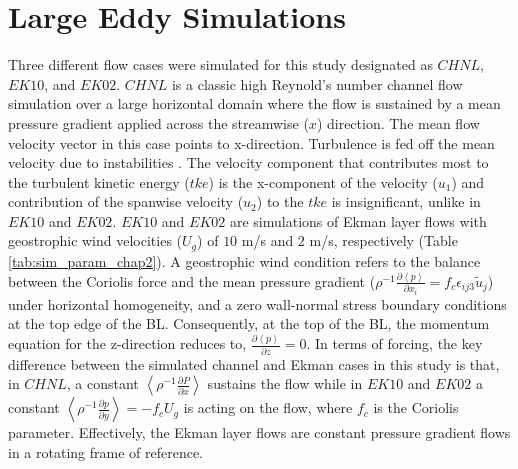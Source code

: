 \section{Large Eddy Simulations}
\label{sec:LES_chap2}
Three different flow cases were simulated for this study designated as $CHNL$, $EK10$, and $EK02$. $CHNL$ is a classic high Reynold's number channel flow simulation over a large horizontal domain where the flow is sustained by a mean pressure gradient applied across the streamwise ($x$) direction. The mean flow velocity vector in this case points to x-direction. Turbulence is fed off the mean velocity due to instabilities \citep{landahl_christensen_book_92}. The velocity component that contributes most to the turbulent kinetic energy ($tke$) is the x-component of the velocity ($u_1$) and contribution of the spanwise velocity ($u_2$) to the $tke$ is insignificant, unlike in $EK10$ and $EK02$. $EK10$ and $EK02$ are simulations of Ekman layer flows with geostrophic wind velocities ($U_g$) of $10$ m/s and $2$ m/s, respectively (Table \ref{tab:sim_param_chap2}). A geostrophic wind condition refers to the balance between the Coriolis force and the mean pressure gradient ($\rho^{-1}\frac{\partial \left < p \right >}{\partial x_i} = f_c\epsilon_{ij3}\tilde{u}_j$) under horizontal homogeneity, and a zero wall-normal stress boundary conditions at the top edge of the BL. Consequently, at the top of the BL, the momentum equation for the z-direction reduces to, $\frac{\partial \left < p \right >}{\partial z} = 0$. In terms of forcing, the key difference between the simulated channel and Ekman cases in this study is that, in $CHNL$, a constant $\left < \rho^{-1} \frac{\partial P}{\partial x} \right >$ sustains the flow while in $EK10$ and $EK02$ a constant $\left < \rho^{-1}\frac{\partial p }{\partial y} \right >  = -f_c U_g$ is acting on the flow, where $f_c$ is the Coriolis parameter. Effectively, the Ekman layer flows are constant pressure gradient flows in a rotating frame of reference. 

